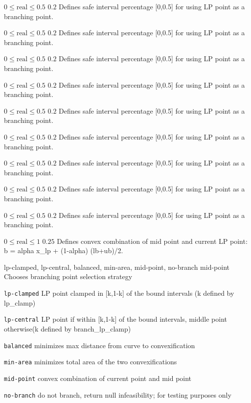 %
{$0\leq\textrm{real}\leq0.5$}%
{$0.2$}%
{Defines safe interval percentage [0,0.5] for using LP point as a branching point.}%
{}

%
{$0\leq\textrm{real}\leq0.5$}%
{$0.2$}%
{Defines safe interval percentage [0,0.5] for using LP point as a branching point.}%
{}

%
{$0\leq\textrm{real}\leq0.5$}%
{$0.2$}%
{Defines safe interval percentage [0,0.5] for using LP point as a branching point.}%
{}

%
{$0\leq\textrm{real}\leq0.5$}%
{$0.2$}%
{Defines safe interval percentage [0,0.5] for using LP point as a branching point.}%
{}

%
{$0\leq\textrm{real}\leq0.5$}%
{$0.2$}%
{Defines safe interval percentage [0,0.5] for using LP point as a branching point.}%
{}

%
{$0\leq\textrm{real}\leq0.5$}%
{$0.2$}%
{Defines safe interval percentage [0,0.5] for using LP point as a branching point.}%
{}

%
{$0\leq\textrm{real}\leq0.5$}%
{$0.2$}%
{Defines safe interval percentage [0,0.5] for using LP point as a branching point.}%
{}

%
{$0\leq\textrm{real}\leq0.5$}%
{$0.2$}%
{Defines safe interval percentage [0,0.5] for using LP point as a branching point.}%
{}

%
{$0\leq\textrm{real}\leq0.5$}%
{$0.2$}%
{Defines safe interval percentage [0,0.5] for using LP point as a branching point.}%
{}

%
{$0\leq\textrm{real}\leq1$}%
{$0.25$}%
{Defines convex combination of mid point and current LP point: b = alpha x\_lp + (1-alpha) (lb+ub)/2.}%
{}

%
{\ttfamily lp-clamped, lp-central, balanced, min-area, mid-point, no-branch}%
{mid-point}%
{Chooses branching point selection strategy}%
{\begin{list}{}{
\setlength{\parsep}{0em}
\setlength{\leftmargin}{5ex}
\setlength{\labelwidth}{2ex}
\setlength{\itemindent}{0ex}
\setlength{\topsep}{0pt}}
\item[\texttt{lp-clamped}] LP point clamped in [k,1-k] of the bound intervals (k defined by lp\_clamp)
\item[\texttt{lp-central}] LP point if within [k,1-k] of the bound intervals, middle point otherwise(k defined by branch\_lp\_clamp)
\item[\texttt{balanced}] minimizes max distance from curve to convexification
\item[\texttt{min-area}] minimizes total area of the two convexifications
\item[\texttt{mid-point}] convex combination of current point and mid point
\item[\texttt{no-branch}] do not branch, return null infeasibility; for testing purposes only
\end{list}
}

